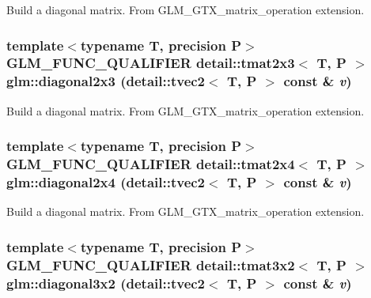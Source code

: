 Build a diagonal matrix. From GLM\_\-GTX\_\-matrix\_\-operation extension. \hypertarget{group__gtx__matrix__operation_g1d2984ab67cc886c70b1c4993c953d09}{
\subsubsection[diagonal2x3]{\setlength{\rightskip}{0pt plus 5cm}template$<$typename T, precision P$>$ GLM\_\-FUNC\_\-QUALIFIER detail::tmat2x3$<$ T, P $>$ glm::diagonal2x3 (detail::tvec2$<$ T, P $>$ const \& {\em v})}}
\label{group__gtx__matrix__operation_g1d2984ab67cc886c70b1c4993c953d09}


Build a diagonal matrix. From GLM\_\-GTX\_\-matrix\_\-operation extension. \hypertarget{group__gtx__matrix__operation_gfba1800a8c3e19da77cb4cd4f1bd72e6}{
\subsubsection[diagonal2x4]{\setlength{\rightskip}{0pt plus 5cm}template$<$typename T, precision P$>$ GLM\_\-FUNC\_\-QUALIFIER detail::tmat2x4$<$ T, P $>$ glm::diagonal2x4 (detail::tvec2$<$ T, P $>$ const \& {\em v})}}
\label{group__gtx__matrix__operation_gfba1800a8c3e19da77cb4cd4f1bd72e6}


Build a diagonal matrix. From GLM\_\-GTX\_\-matrix\_\-operation extension. \hypertarget{group__gtx__matrix__operation_g91808d304a0220c4e4c68e477ffa2fd2}{
\subsubsection[diagonal3x2]{\setlength{\rightskip}{0pt plus 5cm}template$<$typename T, precision P$>$ GLM\_\-FUNC\_\-QUALIFIER detail::tmat3x2$<$ T, P $>$ glm::diagonal3x2 (detail::tvec2$<$ T, P $>$ const \& {\em v})}}
\label{group__gtx__matrix__operation_g91808d304a0220c4e4c68e477ffa2fd2}


